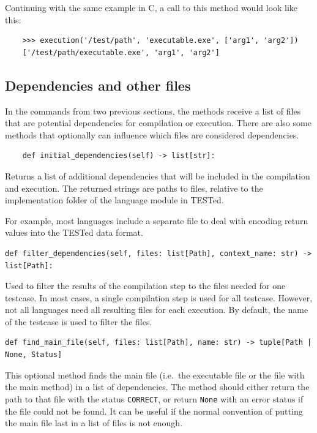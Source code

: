 \documentclass[../main]{subfiles}
\begin{document}
Continuing with the same example in C, a call to this method would look like this:

\begin{verbatim}
    >>> execution('/test/path', 'executable.exe', ['arg1', 'arg2'])
    ['/test/path/executable.exe', 'arg1', 'arg2']
\end{verbatim}

\subsection{Dependencies and other files}\label{subsec:dependencies-and-other-files}

In the commands from two previous sections, the methods receive a list of files that are potential dependencies for compilation or execution.
There are also some methods that optionally can influence which files are considered dependencies.

\begin{verbatim}
    def initial_dependencies(self) -> list[str]:
\end{verbatim}

Returns a list of additional dependencies that will be included in the compilation and execution.
The returned strings are paths to files, relative to the implementation folder of the language module in TESTed.

For example, most languages include a separate file to deal with encoding return values into the TESTed data format.

\begin{verbatim}
def filter_dependencies(self, files: list[Path], context_name: str) -> list[Path]:
\end{verbatim}

Used to filter the results of the compilation step to the files needed for one testcase.
In most cases, a single compilation step is used for all testcase.
However, not all languages need all resulting files for each execution.
By default, the name of the testcase is used to filter the files.

\begin{verbatim}
def find_main_file(self, files: list[Path], name: str) -> tuple[Path | None, Status]
\end{verbatim}

This optional method finds the main file (i.e.\ the executable file or the file with the main method) in a list of dependencies.
The method should either return the path to that file with the status \texttt{CORRECT}, or return \texttt{None} with an error status if the file could not be found.
It can be useful if the normal convention of putting the main file last in a list of files is not enough.
\end{document}
